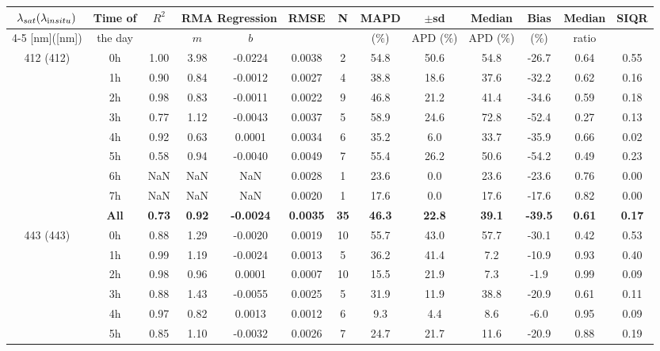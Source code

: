 \documentclass[preview]{standalone}
\begin{document}
\tiny

\tiny
\centering
\begin{tabular}{ccccccccccccc} 
 \hline 
$\lambda_{sat} (\lambda_{\text in situ})$ & Time of & $R^2$ & \multicolumn{2}{c}{RMA Regression} & RMSE & N & MAPD & $\pm$sd & Median & Bias & Median & SIQR \\ \cline{4-5}
[nm]([nm])                  &  the day            &         & $m$     & $b$     &             &     & ($\%$)  & APD ($\%$)  & APD ($\%$)  & ($\%$)   & ratio   &         \\ \hline 
 \hline  
\multirow{9}{*}{412 (412)} & 0h & 1.00 & 3.98 & -0.0224 & 0.0038 &  2 & 54.8 & 50.6 & 54.8 & -26.7 & 0.64 & 0.55 \\ 
 & 1h  & 0.90 & 0.84 & -0.0012 & 0.0027 &  4 & 38.8 & 18.6 & 37.6 & -32.2 & 0.62 & 0.16 \\ 
 & 2h  & 0.98 & 0.83 & -0.0011 & 0.0022 &  9 & 46.8 & 21.2 & 41.4 & -34.6 & 0.59 & 0.18 \\ 
 & 3h  & 0.77 & 1.12 & -0.0043 & 0.0037 &  5 & 58.9 & 24.6 & 72.8 & -52.4 & 0.27 & 0.13 \\ 
 & 4h  & 0.92 & 0.63 & 0.0001 & 0.0034 &  6 & 35.2 & 6.0 & 33.7 & -35.9 & 0.66 & 0.02 \\ 
 & 5h  & 0.58 & 0.94 & -0.0040 & 0.0049 &  7 & 55.4 & 26.2 & 50.6 & -54.2 & 0.49 & 0.23 \\ 
 & 6h  & NaN & NaN & NaN & 0.0028 &  1 & 23.6 & 0.0 & 23.6 & -23.6 & 0.76 & 0.00 \\ 
 & 7h  & NaN & NaN & NaN & 0.0020 &  1 & 17.6 & 0.0 & 17.6 & -17.6 & 0.82 & 0.00 \\ \cline{2-13}
& \textbf{All} & \textbf{0.73} & \textbf{0.92} & \textbf{-0.0024} & \textbf{0.0035} & \textbf{35} & \textbf{46.3} & \textbf{22.8} & \textbf{39.1} & \textbf{-39.5} & \textbf{0.61} & \textbf{0.17} \\ \hline
\multirow{9}{*}{443 (443)} & 0h & 0.88 & 1.29 & -0.0020 & 0.0019 & 10 & 55.7 & 43.0 & 57.7 & -30.1 & 0.42 & 0.53 \\ 
 & 1h  & 0.99 & 1.19 & -0.0024 & 0.0013 &  5 & 36.2 & 41.4 & 7.2 & -10.9 & 0.93 & 0.40 \\ 
 & 2h  & 0.98 & 0.96 & 0.0001 & 0.0007 & 10 & 15.5 & 21.9 & 7.3 & -1.9 & 0.99 & 0.09 \\ 
 & 3h  & 0.88 & 1.43 & -0.0055 & 0.0025 &  5 & 31.9 & 11.9 & 38.8 & -20.9 & 0.61 & 0.11 \\ 
 & 4h  & 0.97 & 0.82 & 0.0013 & 0.0012 &  6 & 9.3 & 4.4 & 8.6 & -6.0 & 0.95 & 0.09 \\ 
 & 5h  & 0.85 & 1.10 & -0.0032 & 0.0026 &  7 & 24.7 & 21.7 & 11.6 & -20.9 & 0.88 & 0.19 \\ 

\end{tabular}
\end{document}
